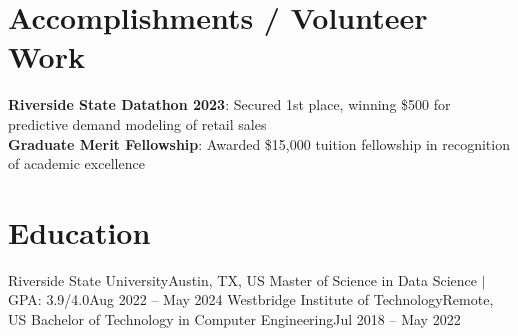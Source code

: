 \section{Accomplishments / Volunteer Work}
 \begin{itemize}[leftmargin=0.15in, label={}]
    \small{\item{
     \textbf{Riverside State Datathon 2023}{: Secured 1st place, winning \$500 for predictive demand modeling of retail sales} \\
     \textbf{Graduate Merit Fellowship}{: Awarded \$15,000 tuition fellowship in recognition of academic excellence}
    }}
 \end{itemize}

\section{Education}
  \resumeSubHeadingListStart
    \resumeSubheading
      {Riverside State University}{Austin, TX, US}
      {Master of Science in Data Science $|$ GPA: 3.9/4.0}{Aug 2022 -- May 2024}
    \resumeSubheading
      {Westbridge Institute of Technology}{Remote, US}
      {Bachelor of Technology in Computer Engineering}{Jul 2018 -- May 2022}
  \resumeSubHeadingListEnd
\vspace*{-\baselineskip}


